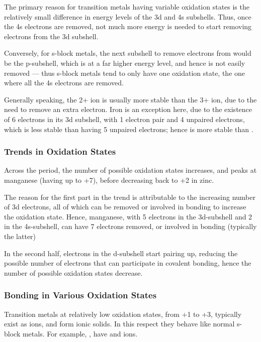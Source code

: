 			The primary reason for transition metals having variable oxidation states is the relatively small difference in energy levels
			of the 3d and 4s subshells. Thus, once the 4s electrons are removed, not much more energy is needed to start removing electrons
			from the 3d subshell.

			Conversely, for s-block metals, the next subshell to remove electrons from would be the p-subshell, which is at a far higher
			energy level, and hence is not easily removed --- thus s-block metals tend to only have one oxidation state, the one where all the
			4s electrons are removed.

			Generally speaking, the 2+ ion is usually more stable than the 3+ ion, due to the need to remove an extra electron. Iron is an
			exception here, due to the existence of 6 electrons in its 3d subshell, with 1 electron pair and 4 unpaired electrons, which
			is less stable than having 5 unpaired electrons; hence  is more stable than .

			\subsubsection{Trends in Oxidation States}

				Across the period, the number of possible oxidation states increases, and peaks at manganese (having up to +7), before
				decreasing back to +2 in zinc.

				The reason for the first part in the trend is attributable to the increasing number of 3d electrons, all of which can be
				removed or involved in bonding to increase the oxidation state. Hence, manganese, with 5 electrons in the 3d-subshell and 2
				in the 4s-subshell, can have 7 electrons removed, or involved in bonding (typically the latter)

				In the second half, electrons in the d-subshell start pairing up, reducing the possible number of electrons that can participate
				in covalent bonding, hence the number of possible oxidation states decrease.


			\subsubsection{Bonding in Various Oxidation States}

				Transition metals at relatively low oxidation states, from +1 to +3, typically exist as ions, and form ionic solids. In this
				respect they behave like normal s-block metals. For example, ,  have  and  ions.

